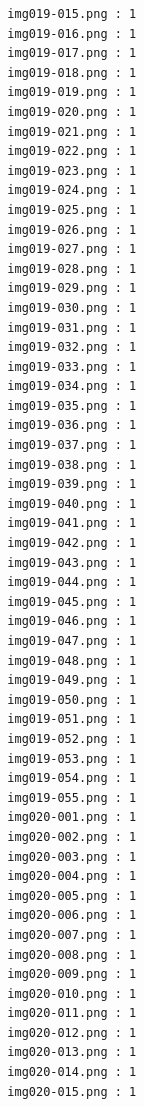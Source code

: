\documentclass[12pt,a4paper]{article}
\begin{document}
\begin{lstlisting}
                     img019-015.png : 1
                     img019-016.png : 1
                     img019-017.png : 1
                     img019-018.png : 1
                     img019-019.png : 1
                     img019-020.png : 1
                     img019-021.png : 1
                     img019-022.png : 1
                     img019-023.png : 1
                     img019-024.png : 1
                     img019-025.png : 1
                     img019-026.png : 1
                     img019-027.png : 1
                     img019-028.png : 1
                     img019-029.png : 1
                     img019-030.png : 1
                     img019-031.png : 1
                     img019-032.png : 1
                     img019-033.png : 1
                     img019-034.png : 1
                     img019-035.png : 1
                     img019-036.png : 1
                     img019-037.png : 1
                     img019-038.png : 1
                     img019-039.png : 1
                     img019-040.png : 1
                     img019-041.png : 1
                     img019-042.png : 1
                     img019-043.png : 1
                     img019-044.png : 1
                     img019-045.png : 1
                     img019-046.png : 1
                     img019-047.png : 1
                     img019-048.png : 1
                     img019-049.png : 1
                     img019-050.png : 1
                     img019-051.png : 1
                     img019-052.png : 1
                     img019-053.png : 1
                     img019-054.png : 1
                     img019-055.png : 1
                     img020-001.png : 1
                     img020-002.png : 1
                     img020-003.png : 1
                     img020-004.png : 1
                     img020-005.png : 1
                     img020-006.png : 1
                     img020-007.png : 1
                     img020-008.png : 1
                     img020-009.png : 1
                     img020-010.png : 1
                     img020-011.png : 1
                     img020-012.png : 1
                     img020-013.png : 1
                     img020-014.png : 1
                     img020-015.png : 1




\end{lstlisting}
\end{document}
